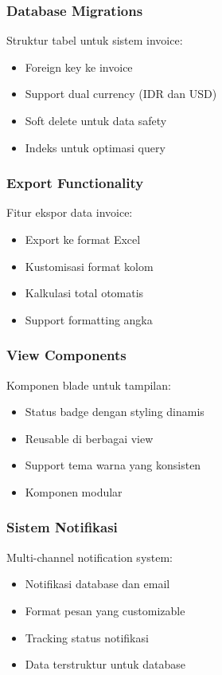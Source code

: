 \documentclass[a4paper]{report}
\begin{document}
\subsubsection{Database Migrations}
Struktur tabel untuk sistem invoice:
\begin{itemize}
\item Foreign key ke invoice
\item Support dual currency (IDR dan USD)
\item Soft delete untuk data safety
\item Indeks untuk optimasi query
\end{itemize}

\subsubsection{Export Functionality}
Fitur ekspor data invoice:
\begin{itemize}
\item Export ke format Excel
\item Kustomisasi format kolom
\item Kalkulasi total otomatis
\item Support formatting angka
\end{itemize}

\subsubsection{View Components}
Komponen blade untuk tampilan:
\begin{itemize}
\item Status badge dengan styling dinamis
\item Reusable di berbagai view
\item Support tema warna yang konsisten
\item Komponen modular
\end{itemize}

\subsubsection{Sistem Notifikasi}
Multi-channel notification system:
\begin{itemize}
\item Notifikasi database dan email
\item Format pesan yang customizable
\item Tracking status notifikasi
\item Data terstruktur untuk database
\end{itemize}
\end{document}
